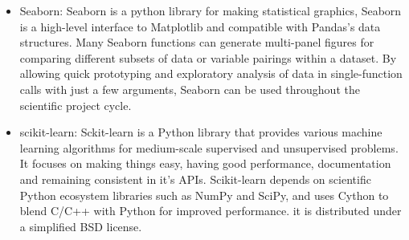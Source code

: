 \begin{itemize}
	\item Seaborn: Seaborn is a python library for making statistical graphics, Seaborn is a high-level interface to Matplotlib and compatible with Pandas's data structures. Many Seaborn functions can generate multi-panel figures for comparing different subsets of data or variable pairings within a dataset. By allowing quick prototyping and exploratory analysis of data in single-function calls with just a few arguments, Seaborn can be used throughout the scientific project cycle.  \cite{seaborn}

	\item scikit-learn: Sckit-learn is a Python library that provides various machine learning algorithms for medium-scale supervised and unsupervised problems. It focuses on making things easy, having good performance, documentation and remaining consistent in it's APIs. Scikit-learn depends on scientific Python ecosystem libraries such as NumPy and SciPy, and uses Cython to blend C/C++ with Python for improved performance. it is distributed under a simplified BSD license.\cite{scikit-learn}



\end{itemize}
